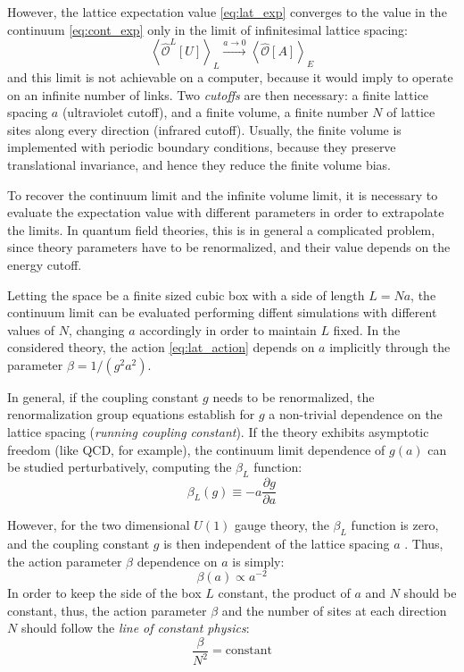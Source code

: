 However, the lattice expectation value \eqref{eq:lat_exp} converges to the value in the continuum \eqref{eq:cont_exp} only in the limit of infinitesimal lattice spacing:
\begin{equation}\label{eq:cont_limit}
    \left<\hat{\mathcal O}^L[U]\right>_L \xrightarrow{a\to0} \left<\hat{\mathcal O}[A]\right>_E
\end{equation}
and this limit is not achievable on a computer, because it would imply to operate on an infinite number of links.
Two \emph{cutoffs} are then necessary: a finite lattice spacing $a$ (ultraviolet cutoff),
and a finite volume, \ie a finite number $N$ of lattice sites along every direction (infrared cutoff).
Usually, the finite volume is implemented with periodic boundary conditions,
because they preserve translational invariance, and hence they reduce the finite volume bias.

To recover the continuum limit and the infinite volume limit,
it is necessary to evaluate the expectation value with different parameters in order to extrapolate the limits.
In quantum field theories, this is in general a complicated problem,
since theory parameters have to be renormalized, and their value depends on the energy cutoff.

Letting the space be a finite sized cubic box with a side of length $L=Na$,
the continuum limit can be evaluated performing diffent simulations with different values of $N$, changing $a$ accordingly in order to maintain $L$ fixed.
In the considered theory, the action \eqref{eq:lat_action} depends on $a$ implicitly through the parameter $\beta = 1/(g^2a^2)$.

In general, if the coupling constant $g$ needs to be renormalized,
the renormalization group equations establish for $g$ a non-trivial dependence on the lattice spacing (\emph{running coupling constant}).
If the theory exhibits asymptotic freedom (like QCD, for example), the continuum limit dependence of $g(a)$ can be studied perturbatively, computing the $\beta_L$ function:
\[
    \beta_L(g) \equiv -a\frac{\partial g}{\partial a}
\]

However, for the two dimensional $U(1)$ gauge theory, the $\beta_L$ function is zero, and the coupling constant $g$ is then independent of the lattice spacing $a$ \cite{casana:1997}.
Thus, the action parameter $\beta$ dependence on $a$ is simply:
\[
    \beta(a) \propto a^{-2}
\]
In order to keep the side of the box $L$ constant, the product of $a$ and $N$ should be constant,
thus, the action parameter $\beta$ and the number of sites at each direction $N$ should follow the \emph{line of constant physics}:
\begin{equation}\label{eq:const_phys}
    \frac{\beta}{N^2} = \text{constant}
\end{equation}

